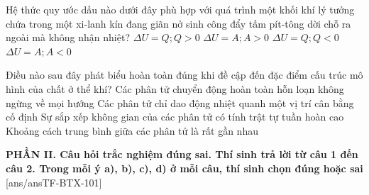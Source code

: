\begin{ex}%
	Hệ thức quy ước dấu nào dưới đây phù hợp với quá trình một khối khí lý tưởng chứa trong một xi-lanh kín đang giãn nở sinh công đẩy tấm pít-tông dời chỗ ra ngoài mà không nhận nhiệt?
	\choice
	{$\Delta U=Q; Q>0$}
	{$\Delta U=A; A>0$}
	{$\Delta U=Q; Q<0$}
	{\True $\Delta U=A; A<0$}
\end{ex}

\begin{ex}%
	Điều nào sau đây phát biểu hoàn toàn đúng khi đề cập đến đặc điểm cấu trúc mô hình của chất ở thể khí?
	\choice
	{\True Các phân tử chuyển động hoàn toàn hỗn loạn không ngừng về mọi hướng}
	{Các phân tử chỉ dao động nhiệt quanh một vị trí cân bằng cố định}
	{Sự sắp xếp không gian của các phân tử có tính trật tự tuần hoàn cao}
	{Khoảng cách trung bình giữa các phân tử là rất gần nhau}
\end{ex}


\noindent \textbf{PHẦN II. Câu hỏi trắc nghiệm đúng sai. Thí sinh trả lời từ câu 1 đến câu 2. Trong mỗi ý a), b), c), d) ở mỗi câu, thí sinh chọn đúng hoặc sai}
[ans/ansTF-BTX-101]

